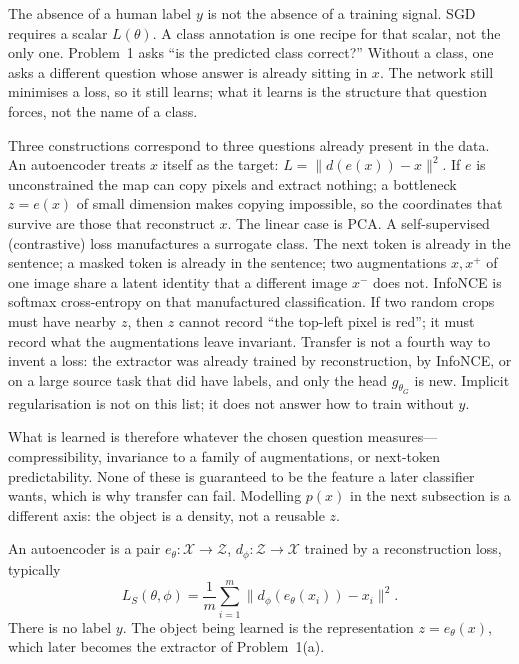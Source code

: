 \begin{remark}
\label{rem:dlu-why-no-y}
The absence of a human label \(y\) is not the absence of a training signal. SGD requires a scalar \(L(\theta)\). A class annotation is one recipe for that scalar, not the only one. Problem~1 asks ``is the predicted class correct?'' Without a class, one asks a different question whose answer is already sitting in \(x\). The network still minimises a loss, so it still learns; what it learns is the structure that question forces, not the name of a class.

Three constructions correspond to three questions already present in the data. An autoencoder treats \(x\) itself as the target: \(L=\|d(e(x))-x\|^2\). If \(e\) is unconstrained the map can copy pixels and extract nothing; a bottleneck \(z=e(x)\) of small dimension makes copying impossible, so the coordinates that survive are those that reconstruct \(x\). The linear case is PCA. A self-supervised (contrastive) loss manufactures a surrogate class. The next token is already in the sentence; a masked token is already in the sentence; two augmentations \(x,x^+\) of one image share a latent identity that a different image \(x^-\) does not. InfoNCE is softmax cross-entropy on that manufactured classification. If two random crops must have nearby \(z\), then \(z\) cannot record ``the top-left pixel is red''; it must record what the augmentations leave invariant. Transfer is not a fourth way to invent a loss: the extractor was already trained by reconstruction, by InfoNCE, or on a large source task that did have labels, and only the head \(g_{\theta_G}\) is new. Implicit regularisation is not on this list; it does not answer how to train without \(y\).

What is learned is therefore whatever the chosen question measures---compressibility, invariance to a family of augmentations, or next-token predictability. None of these is guaranteed to be the feature a later classifier wants, which is why transfer can fail. Modelling \(p(x)\) in the next subsection is a different axis: the object is a density, not a reusable \(z\).
\end{remark}

\begin{definition}[Autoencoder]
\label{def:dlu-ae}
An autoencoder is a pair \(e_{\theta}:\mathcal{X}\to\mathcal{Z}\), \(d_{\phi}:\mathcal{Z}\to\mathcal{X}\) trained by a reconstruction loss, typically
\[
L_S(\theta,\phi)
=
\frac1m\sum_{i=1}^m
\bigl\|d_{\phi}(e_{\theta}(x_i))-x_i\bigr\|^2.
\]
There is no label \(y\). The object being learned is the representation \(z=e_{\theta}(x)\), which later becomes the extractor of Problem~1(a).
\end{definition}

